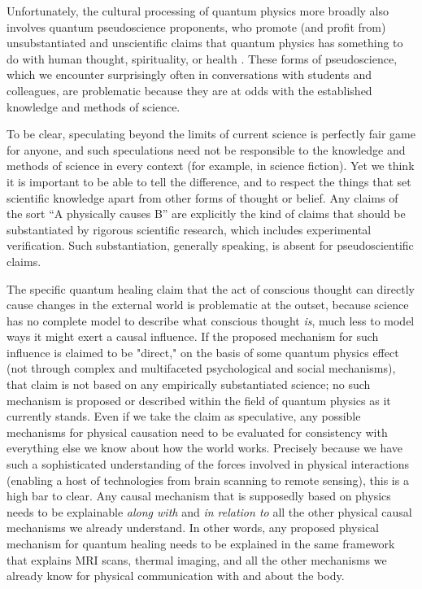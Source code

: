 \documentclass[12pt,onecolumn,preprintnumbers,amsmath,amssymbn,reprint,nofootinbib,superscriptaddress]{revtex4}    %
\begin{document}
Unfortunately, the cultural processing of quantum physics more broadly also involves quantum pseudoscience proponents, who promote (and profit from) unsubstantiated and unscientific claims that quantum physics has something to do with human thought, spirituality, or health \cite{Pessoa}.  These forms of pseudoscience, which we encounter surprisingly often in conversations with students and colleagues, are problematic because they are at odds with the established knowledge and methods of science. 

To be clear, speculating beyond the limits of current science is perfectly fair game for anyone, and such speculations need not be responsible to the knowledge and methods of science in every context (for example, in science fiction).  Yet we think it is important to be able to tell the difference, and to respect the things that set scientific knowledge apart from other forms of thought or belief. Any claims of the sort ``A physically causes B'' are explicitly the kind of claims that should be substantiated by rigorous scientific research, which includes experimental verification.  
Such substantiation, generally speaking, is absent for pseudoscientific claims.  

The specific quantum healing claim that the act of conscious thought can directly cause changes in the external world is problematic at the outset, because science has no complete model to describe what conscious thought {\em is}, much less to model ways it might exert a causal influence. If the proposed mechanism for such influence is claimed to be "direct," on the basis of some quantum physics effect (not through complex and multifaceted psychological and social mechanisms), that claim is not based on any empirically substantiated science; no such mechanism is proposed or described within the field of quantum physics as it currently stands.  Even if we take the claim as speculative, any possible mechanisms for physical causation need to be evaluated for consistency with everything else we know about how the world works. Precisely because we have such a sophisticated understanding of the forces involved in physical interactions (enabling a host of technologies from brain scanning to remote sensing), this is a high bar to clear. Any causal mechanism that is supposedly based on physics needs to be explainable {\em along with} and {\em in relation to} all the other physical causal mechanisms we already understand.  In other words, any proposed physical mechanism for quantum healing needs to be explained in the same framework that explains MRI scans, thermal imaging, and all the other mechanisms we already know for physical communication with and about the body.   
\end{document}
